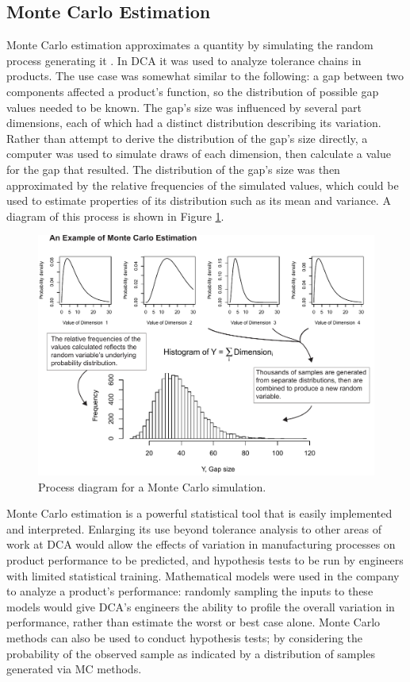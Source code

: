 \documentclass[11pt,a4paper,article]{memoir} %
\begin{document}
\subsection*{Monte Carlo Estimation}
Monte Carlo estimation approximates a quantity by simulating the random process generating it . In DCA it was used to analyze tolerance chains in products. The use case was somewhat similar to the following: a gap between two components affected a product's function, so the distribution of possible gap values needed to be known. The gap's size was influenced by several part dimensions, each of which had a distinct distribution describing its variation. Rather than attempt to derive the distribution of the gap's size directly, a computer was used to simulate draws of each dimension, then calculate a value for the gap that resulted. The distribution of the gap's size was then approximated by the relative frequencies of the simulated values, which could be used to estimate properties of its distribution such as its mean and variance. A diagram of this process is shown in Figure \ref{fig:monte_carlo}.
\begin{figure}[h!]
\includegraphics[width=1\textwidth]{MC_estimation.pdf}
\caption{Process diagram for a Monte Carlo simulation.}
\label{fig:monte_carlo}
\end{figure}

Monte Carlo estimation is a powerful statistical tool that is easily implemented and interpreted. Enlarging its use beyond tolerance analysis to other areas of work at DCA would allow the effects of variation in manufacturing processes on product performance to be predicted, and hypothesis tests to be run by engineers with limited statistical training. Mathematical models were used in the company to analyze a product's performance: randomly sampling the inputs to these models would give DCA's engineers the ability to profile the overall variation in performance, rather than estimate the worst or best case alone. Monte Carlo methods can also be used to conduct hypothesis tests; by considering the probability of the observed sample as indicated by a distribution of samples generated via MC methods.
\end{document}
